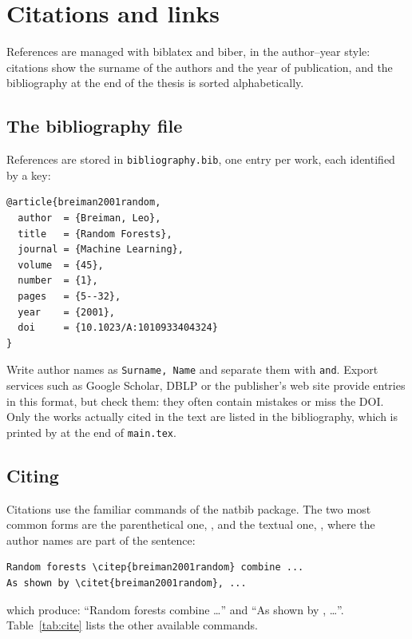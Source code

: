 \chapter{Citations and links} \label{ch3}

References are managed with biblatex and biber, in the author--year style:
citations show the surname of the authors and the year of publication, and
the bibliography at the end of the thesis is sorted alphabetically.

\section{The bibliography file}

References are stored in \texttt{bibliography.bib}, one entry per work, each
identified by a key:
\begin{Verbatim}
@article{breiman2001random,
  author  = {Breiman, Leo},
  title   = {Random Forests},
  journal = {Machine Learning},
  volume  = {45},
  number  = {1},
  pages   = {5--32},
  year    = {2001},
  doi     = {10.1023/A:1010933404324}
}
\end{Verbatim}
Write author names as \texttt{Surname, Name} and separate them with
\texttt{and}. Export services such as Google Scholar, DBLP or the publisher's
web site provide entries in this format, but check them: they often contain
mistakes or miss the DOI. Only the works actually cited in the text are
listed in the bibliography, which is printed by 
at the end of \texttt{main.tex}.

\section{Citing}

Citations use the familiar commands of the natbib package. The two most
common forms are the parenthetical one, , and the textual one,
, where the author names are part of the sentence:
\begin{Verbatim}
Random forests \citep{breiman2001random} combine ...
As shown by \citet{breiman2001random}, ...
\end{Verbatim}
which produce: ``Random forests \citep{breiman2001random} combine \dots''
and ``As shown by \citet{breiman2001random}, \dots''. Table~\ref{tab:cite}
lists the other available commands.

